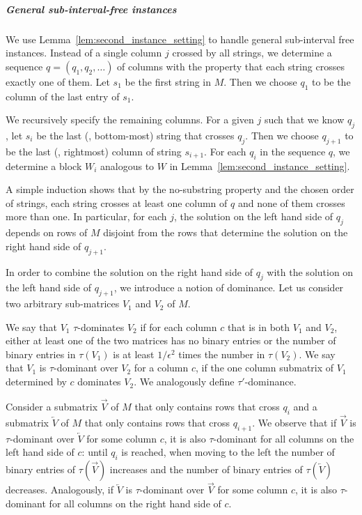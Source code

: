 \subparagraph{General sub-interval-free instances} 
We use Lemma~\ref{lem:second_instance_setting} to handle general sub-interval free instances.
Instead of a single column $j$ crossed by all strings, we determine a sequence $q = (q_1,q_2,\dotsc)$ of columns with the property that each string crosses exactly one of them.
Let $s_1$ be the first string in $M$.
Then we choose $q_1$ to be the column of the last entry of $s_1$.

We recursively specify the remaining columns.
For a given $j$ such that we know $q_j$, let $s_i$ be the last (\ie, bottom-most) string that crosses $q_j$.
Then we choose $q_{j+1}$ to be the last (\ie, rightmost) column of string $s_{i+1}$.
For each $q_i$ in the sequence $q$, we determine a block $W_i$ analogous to $W$ in Lemma~\ref{lem:second_instance_setting}.

A simple induction shows that by the no-substring property and the chosen order of strings, each string crosses at least one column of $q$ and none of them crosses more than one.
In particular, for each $j$, the solution on the left hand side of $q_j$ depends on rows of $M$ disjoint from the rows that determine the solution on the right hand side of $q_{j+1}$. 

In order to combine the solution on the right hand side of $q_j$ with the solution on the left hand side of $q_{j+1}$, we introduce a notion of dominance.
Let us consider two arbitrary sub-matrices $V_1$ and $V_2$ of $M$.
\begin{definition}[Dominance]
    \label{def:dominance}
    We say that $V_1$ $\tau$-dominates $V_2$ if for each column $c$ that is in both $V_1$ and $V_2$, either at least one of the two matrices has no binary entries or
    the number of binary entries in $\tau(V_1)$ is at least $1/\epsilon^2$ times the number in $\tau(V_2)$.
    We say that $V_1$ is $\tau$-dominant over $V_2$ for a column $c$, if the one column submatrix of $V_1$ determined by $c$ dominates $V_2$. 
%
    We analogously define $\tau'$-dominance.
\end{definition}

Consider a submatrix $\overrightarrow{V}$ of $M$ that only contains rows that cross $q_i$ and a submatrix $\overleftarrow{V}$ of $M$ that only contains rows that cross $q_{i+1}$.
We observe that if $\overrightarrow{V}$ is $\tau$-dominant over $\overleftarrow{V}$ for some column $c$, it is also $\tau$-dominant for all columns on the left hand side of $c$:
until $q_i$ is reached, when moving to the left the number of binary entries of $\tau(\overrightarrow{V})$ increases and the number of binary entries of $\tau(\overleftarrow{V})$ decreases.
Analogously, if $\overleftarrow{V}$ is $\tau$-dominant over $\overrightarrow{V}$ for some column $c$, it is also $\tau$-dominant for all columns on the right hand side of $c$.

